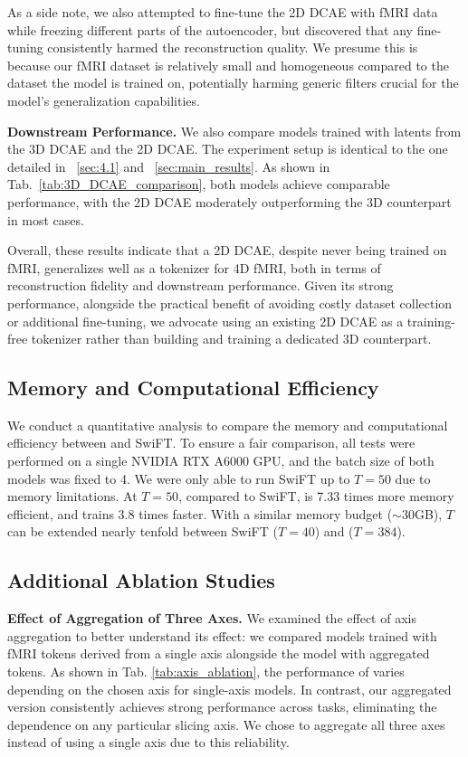 As a side note, we also attempted to fine-tune the 2D DCAE with fMRI data while freezing different parts of the autoencoder, but discovered that any fine-tuning consistently harmed the reconstruction quality. We presume this is because our fMRI dataset is relatively small and homogeneous compared to the dataset the model is trained on, potentially harming generic filters crucial for the model's generalization capabilities. 

\noindent \textbf{Downstream Performance.}
We also compare {\ours} models trained with latents from the 3D DCAE and the 2D DCAE. The experiment setup is identical to the one detailed in ~\cref{sec:4.1} and ~\cref{sec:main_results}. 
As shown in Tab.~\ref{tab:3D_DCAE_comparison}, both models achieve comparable performance, with the 2D DCAE moderately outperforming the 3D counterpart in most cases.

Overall, these results indicate that a 2D DCAE, despite never being trained on fMRI, generalizes well as a tokenizer for 4D fMRI, both in terms of reconstruction fidelity and downstream performance. Given its strong performance, alongside the practical benefit of avoiding costly dataset collection or additional fine-tuning, we advocate using an existing 2D DCAE as a training-free tokenizer rather than building and training a dedicated 3D counterpart. 



\subsection{Memory and Computational Efficiency}

We conduct a quantitative analysis to compare the memory and computational efficiency between {\ours} and SwiFT. To ensure a fair comparison, all tests were performed on a single NVIDIA RTX A6000 GPU, and the batch size of both models was fixed to 4. 
We were only able to run SwiFT up to $T=50$ due to memory limitations. At $T=50$, compared to SwiFT, {\ours} is 7.33 times more memory efficient, and trains 3.8 times faster. With a similar memory budget ($\sim$30GB), $T$ can be extended nearly tenfold between SwiFT ($T=40$) and {\ours} ($T=384$).





\subsection{Additional Ablation Studies}
\label{sec:ablation_studies}
\noindent \textbf{Effect of Aggregation of Three Axes.}
We examined the effect of axis aggregation to better understand its effect: we compared models trained with fMRI tokens derived from a single axis alongside the model with aggregated tokens.
As shown in Tab. \ref{tab:axis_ablation}, the performance of {\ours} varies depending on the chosen axis for single-axis models.
In contrast, our aggregated version consistently achieves strong performance across tasks, eliminating the dependence on any particular slicing axis. We chose to aggregate all three axes instead of using a single axis due to this reliability.


